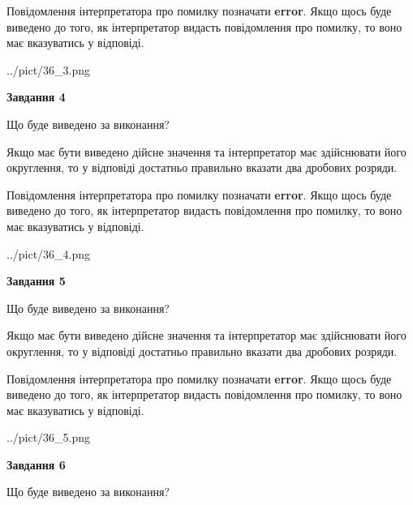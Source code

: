 \documentclass[12pt, ukrainian]{article}
\begin{document}
{\begin {Large}
Повідомлення інтерпретатора про помилку позначати \textbf{error}.
Якщо щось буде виведено до того, як інтерпретатор видасть повідомлення про помилку, 
то воно має вказуватись у відповіді. \par

\begin{center}
	{../pict/36_3.png}
\end{center}
\newpage

{\begin {center}\textbf{Завдання 4}\end {center}}\par
Що буде виведено за виконання? \par

Якщо має бути виведено дійсне значення та інтерпретатор має здійснювати його округлення, 
то у відповіді достатньо правильно вказати два дробових розряди.

Повідомлення інтерпретатора про помилку позначати \textbf{error}.
Якщо щось буде виведено до того, як інтерпретатор видасть повідомлення про помилку, 
то воно має вказуватись у відповіді. \par

\begin{center}
	{../pict/36_4.png}
\end{center}
\newpage

{\begin {center}\textbf{Завдання 5}\end {center}}\par
Що буде виведено за виконання? \par

Якщо має бути виведено дійсне значення та інтерпретатор має здійснювати його округлення, 
то у відповіді достатньо правильно вказати два дробових розряди.

Повідомлення інтерпретатора про помилку позначати \textbf{error}.
Якщо щось буде виведено до того, як інтерпретатор видасть повідомлення про помилку, 
то воно має вказуватись у відповіді. \par

\begin{center}
	{../pict/36_5.png}
\end{center}
\newpage

{\begin {center}\textbf{Завдання 6}\end {center}}\par
Що буде виведено за виконання? \par


\end{Large}}
\end{document}
